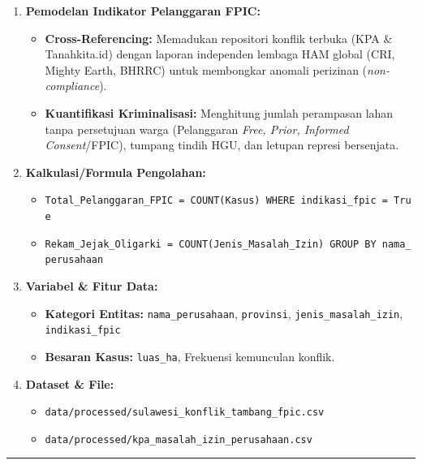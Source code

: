 \documentclass[
]{article}
\providecommand{\tightlist}{%
  \setlength{\itemsep}{0pt}\setlength{\parskip}{0pt}}
\begin{document}
\begin{enumerate}
\def\labelenumi{\arabic{enumi}.}
\tightlist
\item
  \textbf{Pemodelan Indikator Pelanggaran FPIC:}

  \begin{itemize}
  \tightlist
  \item
    \textbf{Cross-Referencing:} Memadukan repositori konflik terbuka
    (KPA \& Tanahkita.id) dengan laporan independen lembaga HAM global
    (CRI, Mighty Earth, BHRRC) untuk membongkar anomali perizinan
    (\emph{non-compliance}).
  \item
    \textbf{Kuantifikasi Kriminalisasi:} Menghitung jumlah perampasan
    lahan tanpa persetujuan warga (Pelanggaran \emph{Free, Prior,
    Informed Consent}/FPIC), tumpang tindih HGU, dan letupan represi
    bersenjata.
  \end{itemize}
\item
  \textbf{Kalkulasi/Formula Pengolahan:}

  \begin{itemize}
  \tightlist
  \item
    \texttt{Total\_Pelanggaran\_FPIC\ =\ COUNT(Kasus)\ WHERE\ indikasi\_fpic\ =\ True}
  \item
    \texttt{Rekam\_Jejak\_Oligarki\ =\ COUNT(Jenis\_Masalah\_Izin)\ GROUP\ BY\ nama\_perusahaan}
  \end{itemize}
\item
  \textbf{Variabel \& Fitur Data:}

  \begin{itemize}
  \tightlist
  \item
    \textbf{Kategori Entitas:} \texttt{nama\_perusahaan},
    \texttt{provinsi}, \texttt{jenis\_masalah\_izin},
    \texttt{indikasi\_fpic}
  \item
    \textbf{Besaran Kasus:} \texttt{luas\_ha}, Frekuensi kemunculan
    konflik.
  \end{itemize}
\item
  \textbf{Dataset \& File:}

  \begin{itemize}
  \tightlist
  \item
    \texttt{data/processed/sulawesi\_konflik\_tambang\_fpic.csv}
  \item
    \texttt{data/processed/kpa\_masalah\_izin\_perusahaan.csv}
  \end{itemize}
\end{enumerate}

\begin{center}\rule{0.5\linewidth}{0.5pt}\end{center}
\end{document}
